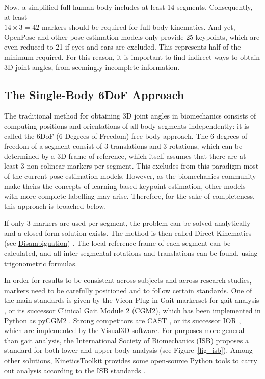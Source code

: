 Now, a simplified full human body includes at least 14 segments. Consequently, at least \\$14 \times 3 = 42$ markers should be required for full-body kinematics. And yet, OpenPose and other pose estimation models only provide 25 keypoints, which are even reduced to 21 if eyes and ears are excluded. This represents half of the minimum required. For this reason, it is important to find indirect ways to obtain 3D joint angles, from seemingly incomplete information.


\subsection{The Single-Body 6DoF Approach}

The traditional method for obtaining 3D joint angles in biomechanics consists of computing positions and orientations of all body segments independently: it is called the 6DoF (6 Degrees of Freedom) free-body approach. The 6 degrees of freedom of a segment consist of 3 translations and 3 rotations, which can be determined by a 3D frame of reference, which itself assumes that there are at least 3 non-colinear markers per segment. This excludes from this paradigm most of the current pose estimation models. However, as the biomechanics community make theirs the concepts of learning-based keypoint estimation, other models with more complete labelling may arise. Therefore, for the sake of completeness, this approach is broached below.

If only 3 markers are used per segment, the problem can be solved analytically and a closed-form solution exists. The method is then called Direct Kinematics (see \hyperlink{Ann:gloss}{Disambiguation}) \cite{Lu1999}. The local reference frame of each segment can be calculated, and all inter-segmental rotations and translations can be found, using trigonometric formulas. 

In order for results to be consistent across subjects and across research studies, markers need to be carefully positioned and to follow certain standards. One of the main standards is given by the Vicon Plug-in Gait markerset for gait analysis \cite{Davis1991}, or its successor Clinical Gait Module 2 (CGM2), which has been implemented in Python as pyCGM2 \cite{Leboeuf2019b}. Strong competitors are CAST \cite{Cappozzo1995}, or its successor IOR \cite{Leardini2007}, which are implemented by the Visual3D software. For purposes more general than gait analysis, the International Society of Biomechanics (ISB) proposes a standard for both lower and upper-body analysis \cite{Wu2002, Wu2005} (see Figure~\ref{fig_isb}). Among other solutions, KineticsToolkit provides some open-source Python tools to carry out analysis according to the ISB standards \cite{Chenier2021}. 

